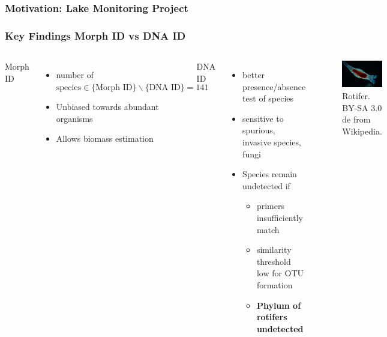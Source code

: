 \documentclass[xcolor=dvipsnames,envcountsect]{beamer}
\newcommand{\licensecc}{\href{https://en.wikipedia.org/wiki/Creative\_Commons}{\cc}}
\begin{document}
\begin{frame}\frametitle{Motivation: Lake Monitoring Project}
\frametitle{Key Findings Morph ID vs DNA ID}
\begin{columns}
Morph ID
\begin{itemize}
    \item number of $\text{species} \in \{\text{Morph ID} \} \backslash \{ \text{DNA ID}\} = 141$
    \item Unbiased towards abundant organisms %
    \item Allows biomass estimation
\end{itemize}
DNA ID
\begin{itemize}
    \item better presence/absence test of species %
    \item sensitive to spurious, invasive species, fungi
    \item Species remain undetected if 
    \begin{itemize}
        \item primers insufficiently match 
        \item similarity threshold low for OTU formation
        \item {\bf Phylum of rotifers undetected}
    \end{itemize}
\end{itemize}
\begin{figure}\centering
    \includegraphics[scale=.4]{rotifer}\caption{Rotifer. \licensecc BY-SA 3.0 de from Wikipedia.}
\end{figure}
\end{columns}
\end{frame}
\end{document}
